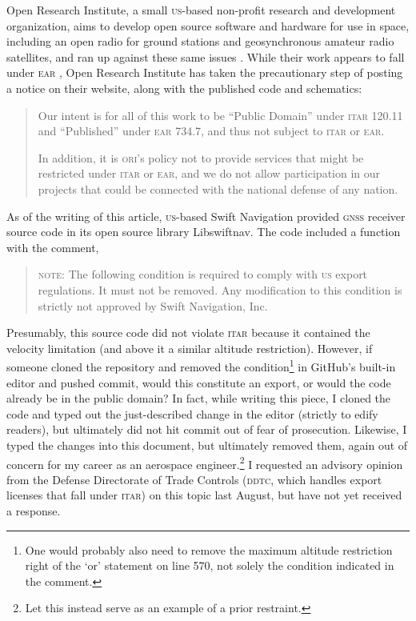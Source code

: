 \documentclass[12pt]{olfmemo}
\begin{document}
Open Research Institute, a small \textsc{us}-based non-profit research and development organization, aims to develop open source software and hardware for use in space, including an open radio for ground stations and geosynchronous amateur radio satellites, and ran up against these same issues \citep{ORIBlog}. While their work appears to fall under \textsc{ear} \citep{ORIDDTC}, Open Research Institute has taken the precautionary step of posting a notice on their website, along with the published code and schematics:
\begin{quote}
Our intent is for all of this work to be ``Public Domain'' under \textsc{itar} 120.11 and ``Published'' under \textsc{ear} 734.7, and thus not subject to \textsc{itar} or \textsc{ear}.

In addition, it is \textsc{ori}'s policy not to provide services that might be restricted under \textsc{itar} or \textsc{ear}, and we do not allow participation in our projects that could be connected with the national defense of any nation. \citep{ORIStatement}
\end{quote}

As of the writing of this article, \textsc{us}-based Swift Navigation provided \textsc{gnss} receiver source code in its open source library Libswiftnav. The code included a function with the comment,
\begin{quote}
\textsc{note}: The following condition is required to comply with \textsc{us} export regulations. It must not be removed. Any modification to this condition is strictly not approved by Swift Navigation, Inc. \citep{Libswiftnav575}
\end{quote}
Presumably, this source code did not violate \textsc{itar} because it contained the velocity limitation (and above it a similar altitude restriction). However, if someone cloned the repository and removed the condition\footnote{One would probably also need to remove the maximum altitude restriction right of the `or' statement on line 570, not solely the condition indicated in the comment.} in GitHub's built-in editor and pushed commit, would this constitute an export, or would the code already be in the public domain? In fact, while writing this piece, I cloned the code and typed out the just-described change in the editor (strictly to edify readers), but ultimately did not hit commit out of fear of prosecution. Likewise, I typed the changes into this document, but ultimately removed them, again out of concern for my career as an aerospace engineer.\footnote{Let this instead serve as an example of a prior restraint.} I requested an advisory opinion from the Defense Directorate of Trade Controls (\textsc{ddtc}, which handles export licenses that fall under \textsc{itar}) on this topic last August, but have not yet received a response.
\end{document}
